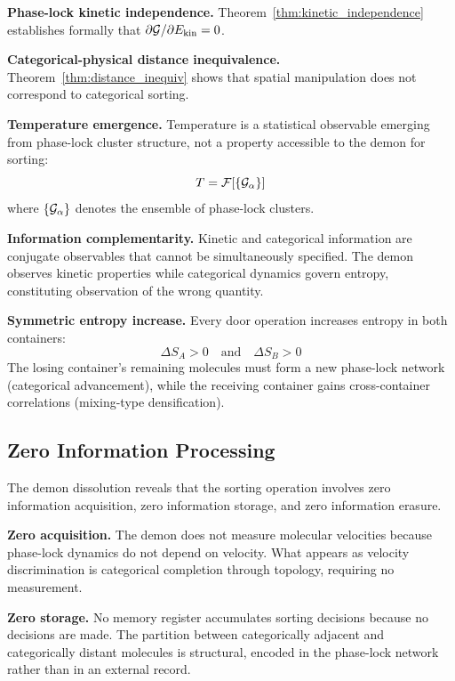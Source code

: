 \textbf{Phase-lock kinetic independence.} Theorem~\ref{thm:kinetic_independence} establishes formally that $\partial \mathcal{G}/\partial E_{\mathrm{kin}} = 0$.

\textbf{Categorical-physical distance inequivalence.} Theorem~\ref{thm:distance_inequiv} shows that spatial manipulation does not correspond to categorical sorting.

\textbf{Temperature emergence.} Temperature is a statistical observable emerging from phase-lock cluster structure, not a property accessible to the demon for sorting:
\begin{equation}
T = \mathcal{F}[\{\mathcal{G}_\alpha\}]
\end{equation}
where $\{\mathcal{G}_\alpha\}$ denotes the ensemble of phase-lock clusters.

\textbf{Information complementarity.} Kinetic and categorical information are conjugate observables that cannot be simultaneously specified. The demon observes kinetic properties while categorical dynamics govern entropy, constituting observation of the wrong quantity.

\textbf{Symmetric entropy increase.} Every door operation increases entropy in both containers:
\begin{equation}
\Delta S_A > 0 \quad \text{and} \quad \Delta S_B > 0
\end{equation}
The losing container's remaining molecules must form a new phase-lock network (categorical advancement), while the receiving container gains cross-container correlations (mixing-type densification).

\subsection{Zero Information Processing}

The demon dissolution reveals that the sorting operation involves zero information acquisition, zero information storage, and zero information erasure.

\textbf{Zero acquisition.} The demon does not measure molecular velocities because phase-lock dynamics do not depend on velocity. What appears as velocity discrimination is categorical completion through topology, requiring no measurement.

\textbf{Zero storage.} No memory register accumulates sorting decisions because no decisions are made. The partition between categorically adjacent and categorically distant molecules is structural, encoded in the phase-lock network rather than in an external record.

